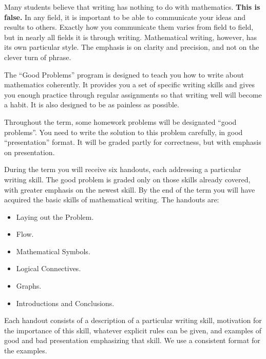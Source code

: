 %
%
%
%
%
%


Many students believe that writing has nothing to
do with mathematics. {\bf This is false.}
In any field, it is important to be able to communicate your ideas and
results to others. Exactly how you communicate them varies from field to
field, but in nearly all fields it is through writing. Mathematical
writing, however, has its own particular style. The emphasis is on clarity
and precision, and not on the clever turn of phrase.

The ``Good Problems'' program is designed to teach you how to write
about mathematics coherently. It provides you a set of specific
writing skills and gives you enough practice through regular
assignments so that writing well will become a habit. It is also
designed to be as painless as possible.

Throughout the term, some homework problems will be designated 
``good problems''. You  need to write the solution to this problem
carefully, in good ``presentation'' format. It will be graded partly for
correctness, but with emphasis on presentation.

During the term you will receive six handouts, each addressing a
particular writing skill. The good problem is graded only on those
skills already covered, with greater emphasis on the newest skill. By
the end of the term you will have acquired the basic skills of
mathematical writing. The handouts are:
\begin{itemize}
\item Laying out the Problem.
\item Flow.
\item Mathematical Symbols.
\item Logical Connectives.
\item Graphs.
\item Introductions and Conclusions.
\end{itemize}
Each handout consists of a description of a particular writing skill,
motivation for the importance of this skill,
whatever explicit rules can be given,
and examples of good and bad presentation emphasizing that skill.
We use a consistent format for the examples.

